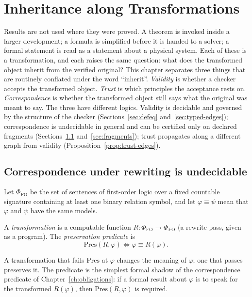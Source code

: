 \chapter{Inheritance along Transformations}
\label{ch:inheritance}

Results are not used where they were proved. A theorem is invoked inside a larger development; a formula is simplified before it is handed to a solver; a formal statement is read as a statement about a physical system. Each of these is a transformation, and each raises the same question: what does the transformed object inherit from the verified original? This chapter separates three things that are routinely conflated under the word ``inherit''. \emph{Validity} is whether a checker accepts the transformed object. \emph{Trust} is which principles the acceptance rests on. \emph{Correspondence} is whether the transformed object still says what the original was meant to say. The three have different logics. Validity is decidable and governed by the structure of the checker (Sections~\ref{sec:defeq} and~\ref{sec:typed-edges}); correspondence is undecidable in general and can be certified only on declared fragments (Sections~\ref{sec:corr-undec} and~\ref{sec:fragments}); trust propagates along a different graph from validity (Proposition~\ref{prop:trust-edges}).

\section{Correspondence under rewriting is undecidable}
\label{sec:corr-undec}

Let $\Phi_{\mathrm{FO}}$ be the set of sentences of first-order logic over a fixed countable signature containing at least one binary relation symbol, and let $\varphi\equiv\psi$ mean that $\varphi$ and $\psi$ have the same models.

\begin{definition}
\label{def:pres}
A \emph{transformation} is a computable function $R:\Phi_{\mathrm{FO}}\to\Phi_{\mathrm{FO}}$ (a rewrite pass, given as a program). The \emph{preservation predicate} is
\[
\mathrm{Pres}(R,\varphi)\iff\varphi\equiv R(\varphi).
\]
\end{definition}

A transformation that fails $\mathrm{Pres}$ at $\varphi$ changes the meaning of $\varphi$; one that passes preserves it. The predicate is the simplest formal shadow of the correspondence predicate of Chapter~\ref{ch:obligations}: if a formal result about $\varphi$ is to speak for the transformed $R(\varphi)$, then $\mathrm{Pres}(R,\varphi)$ is required.

